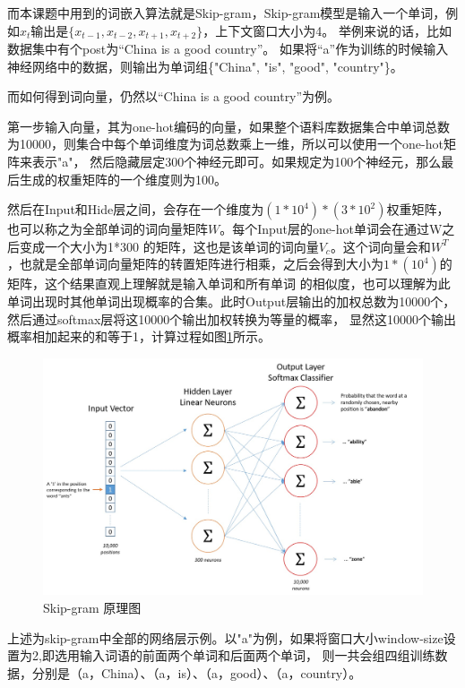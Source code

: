 \documentclass[supercite]{HustGraduPaper}
\theoremstyle{definition}
\begin{document}
而本课题中用到的词嵌入算法就是Skip-gram，Skip-gram模型是输入一个单词，例如$x_t$输出是$\{x_{t-1},x_{t-2},x_{t+1},x_{t+2}\}$，上下文窗口大小为4。
举例来说的话，比如数据集中有个post为“China is a good country”。
如果将“a”作为训练的时候输入神经网络中的数据，则输出为单词组\{"China", "is", "good", "country"\}。

而如何得到词向量，仍然以“China is a good country”为例。

第一步输入向量，其为one-hot编码的向量，如果整个语料库数据集合中单词总数为10000，则集合中每个单词维度为词总数乘上一维，所以可以使用一个one-hot矩阵来表示"a"，
然后隐藏层定300个神经元即可。如果规定为100个神经元，那么最后生成的权重矩阵的一个维度则为100。

然后在Input和Hide层之间，会存在一个维度为$(1*10^4)*(3*10^2)$权重矩阵，也可以称之为全部单词的词向量矩阵$W$。每个Input层的one-hot单词会在通过W之后变成一个大小为1*300
的矩阵，这也是该单词的词向量$V_c$。这个词向量会和$W^T$，也就是全部单词向量矩阵的转置矩阵进行相乘，之后会得到大小为$1*(10^4)$的矩阵，这个结果直观上理解就是输入单词和所有单词
的相似度，也可以理解为此单词出现时其他单词出现概率的合集。此时Output层输出的加权总数为10000个，然后通过softmax层将这10000个输出加权转换为等量的概率，
显然这10000个输出概率相加起来的和等于1，计算过程如图\ref{Fig.skipgram}所示。

\begin{figure}[htbp] %
  \centering %
  \includegraphics[width=1\textwidth]{images/skip-gram.png} %
  \caption{Skip-gram 原理图} %
  \label{Fig.skipgram} %
\end{figure}

上述为skip-gram中全部的网络层示例。以"a"为例，如果将窗口大小window-size设置为2,即选用输入词语的前面两个单词和后面两个单词，
则一共会组四组训练数据，分别是（a，China）、（a，is）、（a，good）、（a，country）。
\end{document}
